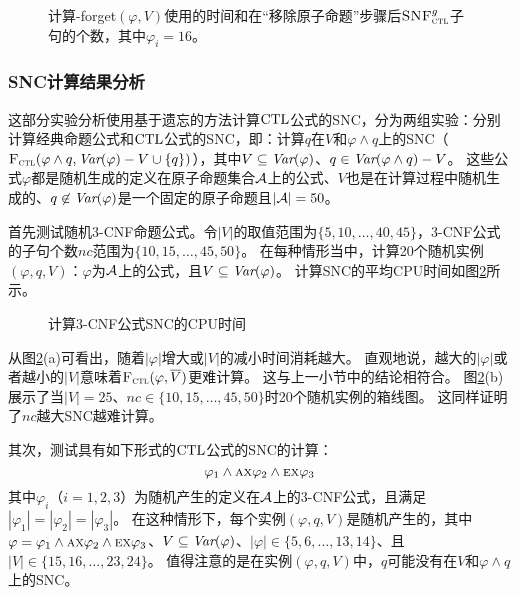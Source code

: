 \begin{figure*}[!htb]
	\centering
	\caption{计算{\CTL-forget}$(\varphi, V)$使用的时间和在“移除原子命题”步骤后${\textsc{SNF}_{\textsc{ctl}}^g}$子句的个数，其中$\varphi_i=16$。}
	\label{chapter04:fig:for16}
\end{figure*}

\subsubsection{SNC计算结果分析}
这部分实验分析使用基于遗忘的方法计算$\textrm{CTL}$公式的SNC，分为两组实验：分别计算经典命题公式和$\textrm{CTL}$公式的SNC，即：计算$q$在$V$和$\varphi \wedge q$上的SNC（${\textsc{F}_{\textsc{ctl}}}(\varphi\wedge q, \textit{Var}(\varphi)-V \cup \{q\})$），其中$V\subseteq \textit{Var}(\varphi)$、$q\in \textit{Var}(\varphi\wedge q)-V$。
这些公式$\varphi$都是随机生成的定义在原子命题集合${\cal A}$上的公式、$V$也是在计算过程中随机生成的、$q\not \in \textit{Var}(\varphi)$是一个固定的原子命题且$|{\cal A}|=50$。

首先测试随机3-CNF命题公式。令$|V|$的取值范围为$\{5,10,\dots, 40,45\}$，3-CNF公式的子句个数$nc$范围为$\{10,15,\dots, 45,50\}$。
在每种情形当中，计算20个随机实例$(\varphi,q,V)$：$\varphi$为${\cal A}$上的公式，且$V\subseteq \textit{Var}(\varphi)$。
计算SNC的平均CPU时间如图\ref{chapter04:fig:ProTime}所示。

\begin{figure*}[!htb]
	\centering
	\caption{%
		计算3-CNF公式SNC的CPU时间}
	\label{chapter04:fig:ProTime}
\end{figure*}


从图\ref{chapter04:fig:ProTime}(a)可看出，随着$|\varphi|$增大或$|V|$的减小时间消耗越大。
直观地说，越大的$|\varphi|$或者越小的$|V|$意味着${\textsc{F}_{\textsc{ctl}}}(\varphi, \overline{V})$更难计算。
这与上一小节中的结论相符合。
图\ref{chapter04:fig:ProTime}(b)展示了当$|V|= 25$、$nc\in \{10,15,\dots, 45, 50\}$时20个随机实例的箱线图。
这同样证明了$nc$越大SNC越难计算。


其次，测试具有如下形式的$\textrm{CTL}$公式的SNC的计算：
$$\varphi_1 \wedge \textsc{a} \textsc{x} \varphi_2 \wedge \textsc{e}\textsc{x} \varphi_3$$
其中$\varphi_i$（$i=1,2,3$）为随机产生的定义在${\cal A}$上的3-CNF公式，且满足$|\varphi_1|=|\varphi_2|=|\varphi_3|$。
在这种情形下，每个实例$(\varphi, q, V)$是随机产生的，其中$\varphi=\varphi_1 \wedge \textsc{a} \textsc{x} \varphi_2 \wedge \textsc{e}\textsc{x} \varphi_3$、$V\subseteq \textit{Var}(\varphi)$、$|\varphi|\in \{5,6,\dots, 13,14\}$、且$|V|\in \{15,16,\dots, 23,24\}$。
值得注意的是在实例$(\varphi, q, V)$中，$q$可能没有在$V$和$\varphi\wedge q$上的SNC。

